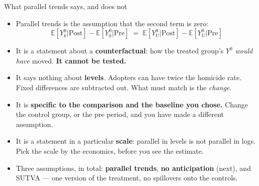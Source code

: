 \documentclass[
  11pt,
  ignorenonframetext,
  aspectratio=169,
]{beamer}
\providecommand{\tightlist}{%
  \setlength{\itemsep}{0pt}\setlength{\parskip}{0pt}}
\begin{document}
\begin{frame}{What parallel trends says, and does not}
\protect{}\label{what-parallel-trends-says-and-does-not}
\begin{itemize}
\tightlist
\item
  Parallel trends is the assumption that the second term is zero: \[
  \mathbb{E}[Y^0_k|\text{Post}] - \mathbb{E}[Y^0_k|\text{Pre}] \;=\; \mathbb{E}[Y^0_U|\text{Post}] - \mathbb{E}[Y^0_U|\text{Pre}]
  \]
\item
  It is a statement about a \textbf{counterfactual}: how the treated
  group's \(Y^0\) \emph{would have} moved. \textbf{It cannot be tested.}
\item
  It says nothing about \textbf{levels}. Adopters can have twice the
  homicide rate. Fixed differences are subtracted out. What must match
  is the \emph{change}.
\item
  It is \textbf{specific to the comparison and the baseline you chose.}
  Change the control group, or the pre period, and you have made a
  different assumption.
\item
  It is a statement in a particular \textbf{scale}: parallel in levels
  is not parallel in logs. Pick the scale by the economics, before you
  see the estimate.
\end{itemize}

\vspace{0.3em}

\begin{itemize}
\tightlist
\item
  Three assumptions, in total: \textbf{parallel trends}, \textbf{no
  anticipation} (next), and SUTVA --- one version of the treatment, no
  spillovers onto the controls.
\end{itemize}
\end{frame}
\end{document}
